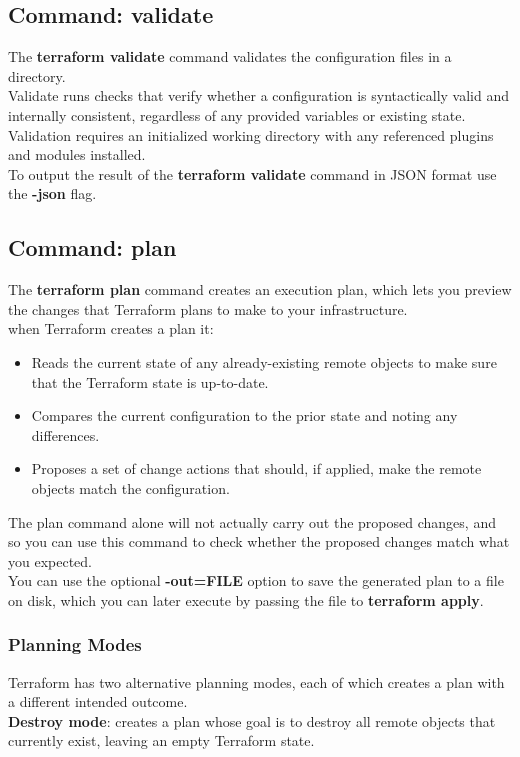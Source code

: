 \documentclass[12pt, letterpaper, twoside]{article}
\begin{document}
\subsection{Command: validate}
The \textbf{terraform validate} command validates the configuration files in a directory.\\
Validate runs checks that verify whether a configuration is syntactically valid and 
internally consistent, regardless of any provided variables or existing state.\\
Validation requires an initialized working directory with any referenced plugins and modules installed.\\

To output the result of the \textbf{terraform validate} command in JSON format use the 
\textbf{-json} flag.

\subsection{Command: plan}
The \textbf{terraform plan} command creates an execution plan, which lets you preview 
the changes that Terraform plans to make to your infrastructure.\\


when Terraform creates a plan it:
\begin{itemize}
    \item Reads the current state of any already-existing remote objects to make 
        sure that the Terraform state is up-to-date.
    \item Compares the current configuration to the prior state and noting any differences.

    \item Proposes a set of change actions that should, if applied, make the remote 
        objects match the configuration.
\end{itemize}
The plan command alone will not actually carry out the proposed changes, and so
you can use this command to check whether the proposed changes match what you expected.\\
You can use the optional \textbf{-out=FILE} option to save the generated plan to 
a file on disk, which you can later execute by passing the file to \textbf{terraform apply}.\\

\subsubsection{Planning Modes}
Terraform has two alternative planning modes, each of which creates a plan with a different 
intended outcome.\\
\textbf{Destroy mode}: creates a plan whose goal is to destroy all remote objects that currently exist, 
leaving an empty Terraform state.\\
\end{document}
